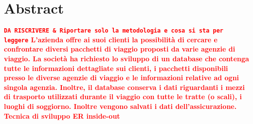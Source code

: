 \section{Abstract}
\textcolor{red}{\textbf{
        \texttt{DA RISCRIVERE \& Riportare solo la metodologia e cosa si sta per leggere} \newline \newline
L'azienda \company offre ai suoi clienti la possibilità di cercare e confrontare diversi pacchetti di viaggio proposti da varie agenzie di viaggio. La società ha richiesto lo sviluppo di un database che contenga tutte le informazioni dettagliate sui clienti, i pacchetti disponibili presso le diverse agenzie di viaggio e le informazioni relative ad ogni singola agenzia. Inoltre, il database conserva i dati riguardanti i mezzi di trasporto utilizzati durante il viaggio con tutte le tratte (o scali), i luoghi di soggiorno. Inoltre vengono salvati i dati dell'assicurazione.
\newline
\newline
Tecnica di sviluppo ER inside-out
}}